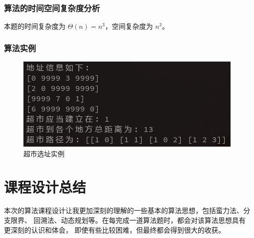 \documentclass{ctexart}
\begin{document}
\subsubsection{算法的时间空间复杂度分析 }
本题的时间复杂度为 $\Theta(n) = n^3$，空间复杂度为 $n^3$。
\subsubsection{算法实例}
\begin{figure}[H]
	\centering
	\includegraphics[scale=0.6]{../images/find_shortest_path.png}
	\caption{超市选址实例}
\end{figure}

\newpage
\section{课程设计总结}
本次的算法课程设计让我更加深刻的理解的一些基本的算法思想，包括蛮力法、分支限界、
回溯法、动态规划等。在每完成一道算法题时，都会对该算法思想具有更深刻的认识和体会，
即使有些比较困难，但最终都会得到很大的收获。
\end{document}
